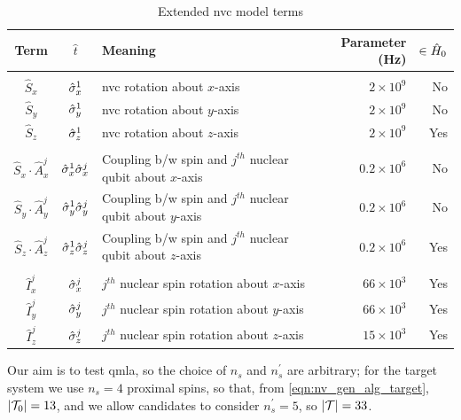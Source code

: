 \par 

\begin{table}
    \begin{tabular}{cclrr}
        Term & $\hat{t}$ & Meaning & Parameter (Hz) & $ \in \hat{H}_0$ \\
        \hline
        \\
        $\hat{S}_x$ & $\hat{\sigma}_{x}^1$ & \gls{nvc} rotation about $x$-axis & $ 2\times 10^9 $ & No \\
        $\hat{S}_y$ & $\hat{\sigma}_{y}^1$ & \gls{nvc} rotation about $y$-axis & $ 2\times 10^9 $ & No \\
        $\hat{S}_z$ & $\hat{\sigma}_{z}^1$ & \gls{nvc} rotation about $z$-axis & $ 2\times 10^9 $ & Yes \\
        \\
        $\hat{S}_x \cdot \hat{A}_x^j$ & $\hat{\sigma}_{x}^1 \hat{\sigma}_{x}^j$ & Coupling b/w spin and $j^{th}$ nuclear qubit about $x$-axis & $ 0.2 \times 10^6 $ & No \\
        $\hat{S}_y \cdot \hat{A}_y^j$ & $\hat{\sigma}_{y}^1 \hat{\sigma}_{y}^j$ & Coupling b/w spin and $j^{th}$ nuclear qubit about $y$-axis & $ 0.2 \times 10^6 $ & No \\
        $\hat{S}_z \cdot \hat{A}_z^j$ & $\hat{\sigma}_{z}^1 \hat{\sigma}_{z}^j$ & Coupling b/w spin and $j^{th}$ nuclear qubit about $z$-axis & $ 0.2 \times 10^6 $ & Yes \\
        \\
        $\hat{I}_x^j$ & $\hat{\sigma}_{x}^j$ & $j^{th}$ nuclear spin rotation about $x$-axis & $ 66\times 10^3$ & Yes \\
        $\hat{I}_y^j$ & $\hat{\sigma}_{y}^j$ & $j^{th}$ nuclear spin rotation about $y$-axis & $ 66\times 10^3 $ & Yes \\
        $\hat{I}_z^j$ & $\hat{\sigma}_{z}^j$ & $j^{th}$ nuclear spin rotation about $z$-axis & $ 15\times 10^3 $ & Yes \\
        \hline 
    \end{tabular}
    \caption[Extended nitrogen-vacancy centre model terms]{
        Extended \gls{nvc} model terms
    }
    \label{table:nv_gen_alg_term_params}
\end{table}

Our aim is to test \gls{qmla}, so the choice of $n_s$ and $n_s^{\prime}$ are arbitrary; 
    for the target system we use $n_s=4$ proximal spins, 
    so that, from \cref{eqn:nv_gen_alg_target},  $\left\lvert \mathcal{T}_0 \right\rvert = 13$,
    and we allow candidates to consider $n_s^{\prime}=5$, 
    so $\left\lvert \mathcal{T} \right\rvert = 33$. 
\par 

